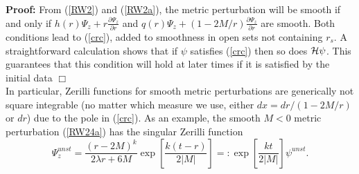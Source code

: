 \documentclass[aps,floats,showpacs,amssymb,tightenlines]{revtex4}
\begin{document}
\noindent
{\bf Proof:} From (\ref{RW2}) and (\ref{RW2a}), the metric perturbation will be smooth
if and only if $h(r) \Psi_z
+r\frac{\partial \Psi_z}{ \partial r} $ and $q(r) \Psi_z+ (1-2M/r)\frac{\partial \Psi_z}{\partial r}$
are smooth. Both conditions lead to (\ref{crc}), added to smoothness in open sets not containing $r_s$.
A straightforward calculation shows that if $\psi$ satisfies (\ref{crc}) then so does ${\cal H} \psi$.
This guarantees that this condition will hold
at later times if it is satisfied by the initial data $\Box$\\

In particular, Zerilli functions for smooth metric perturbations are generically not square integrable  (no matter
which measure we use, either $dx=dr/(1-2M/r)$ or $dr$) due to the
pole in (\ref{crc}). As an example, the smooth $M<0$ metric perturbation (\ref{RW24a}) has the singular Zerilli function
\begin{equation}
\label{ines}
 \Psi_z^{unst}  = \frac{\left( r - 2 M \right) ^{k}}{2 \lambda r +6M} \exp \left[\frac{k(t- r)}{2|M|}\right] =:
 \exp \left[\frac{kt}{2|M|}\right] \psi^{unst}.
\end{equation}
\end{document}
